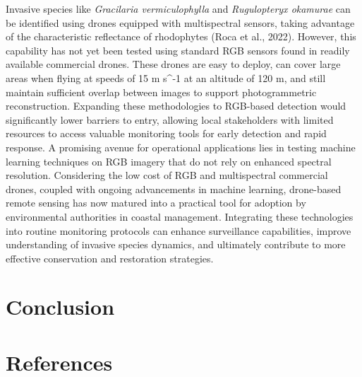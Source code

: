 \documentclass[
  letterpaper,
  DIV=11,
  numbers=noendperiod]{scrartcl}
\begin{document}
Invasive species like \emph{Gracilaria vermiculophylla} and
\emph{Rugulopteryx okamurae} can be identified using drones equipped
with multispectral sensors, taking advantage of the characteristic
reflectance of rhodophytes (Roca et al., 2022). However, this capability
has not yet been tested using standard RGB sensors found in readily
available commercial drones. These drones are easy to deploy, can cover
large areas when flying at speeds of 15 m s\^{}-1 at an altitude of 120
m, and still maintain sufficient overlap between images to support
photogrammetric reconstruction. Expanding these methodologies to
RGB-based detection would significantly lower barriers to entry,
allowing local stakeholders with limited resources to access valuable
monitoring tools for early detection and rapid response. A promising
avenue for operational applications lies in testing machine learning
techniques on RGB imagery that do not rely on enhanced spectral
resolution. Considering the low cost of RGB and multispectral commercial
drones, coupled with ongoing advancements in machine learning,
drone-based remote sensing has now matured into a practical tool for
adoption by environmental authorities in coastal management. Integrating
these technologies into routine monitoring protocols can enhance
surveillance capabilities, improve understanding of invasive species
dynamics, and ultimately contribute to more effective conservation and
restoration strategies.

\section{Conclusion}\label{conclusion}

\section*{References}\label{references}
\end{document}
